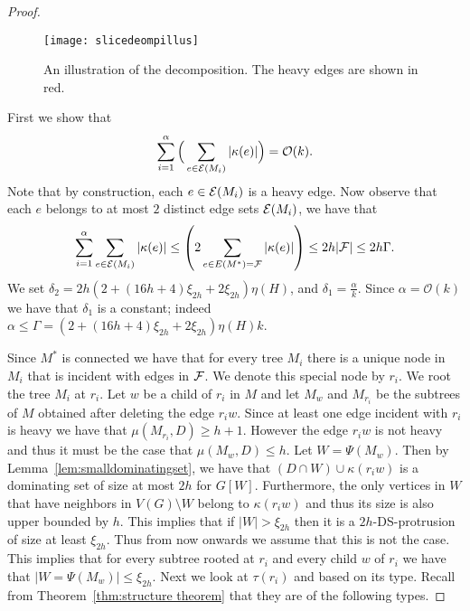 \documentclass[11pt]{article}
\newcommand{\cO}{\mathcal{O}}
\begin{document}
\begin{proof}
\begin{figure}[t]
\begin{center}
\texttt{[image: slicedeompillus]}
\end{center}
 \caption{\label{illus-decompos} An illustration of the decomposition. The heavy edges are shown in red.}
\end{figure}

First we show that $$\sum_{i=1}^{\alpha} \Big(\sum_{e\in {\cal E}(M_i)} |\kappa(e)|\Big)=\cO(k).$$ 
Note that by construction, each  $e\in {\cal E}(M_i)$ is a heavy edge. Now observe that each $e$  belongs to at most $2$ distinct edge sets ${\cal E}(M_i)$, we have that $$\sum_{i=1}^{\alpha} \sum_{e\in {\cal E}(M_i)} |\kappa(e)| \leq \left(2 \sum_{e\in E(M^*)={\cal F}} |\kappa(e)| \right)\leq 2h |{\cal F}|\leq 2h\Gamma.$$ 
We set $\delta_2 = 2h(2+ (16h+4)\xi_{2h}+2 \xi_{2h})\eta(H)$, and $\delta_1=\frac{\alpha}{k}$. Since $\alpha = \cO(k)$ we have that $\delta_1$ is a constant; indeed $\alpha\leq \Gamma= (2+ (16h+4)\xi_{2h}+2 \xi_{2h})\eta(H)k$. 



Since $M^*$ is connected we have that for every tree $M_i$ there is a unique node in $M_i$ that is incident with  edges in $\cal F$. We denote this special node by $r_i$. We root the tree $M_i$ at $r_i$. Let $w$ be a child of $r_i$ in $M$ and let $M_w$  and $M_{r_i}$ be the subtrees of $M$ obtained after deleting the edge $r_iw$. Since at least one edge incident with  $r_i$ is heavy we have that $\mu(M_{r_i},D)\geq h+1$. However the edge $r_iw$ is not heavy and thus it must be the case that $\mu(M_{w},D)\leq h$. Let $W=\Psi(M_w)$. Then  by Lemma~\ref{lem:smalldominatingset}, we have that  $(D\cap W)\cup \kappa(r_iw)$ is a dominating set of size at most $2h$ for $G[W]$. Furthermore, the only vertices in $W$ that have neighbors in $V(G)\setminus W$ belong to $\kappa(r_iw)$ and thus its size is also upper bounded by $h$. This implies that if $|W|>\xi_{2h}$ then it is a  $2h$-{\sc DS}-protrusion of size at least $\xi_{2h}$. Thus  from now onwards we assume that this is not the case. This implies that for every subtree rooted at $r_i$ and every child $w$ of $r_i$  we have that 
 $|W=\Psi(M_w)|\leq \xi_{2h}$. Next we look at $\tau(r_i)$  and based on its type.  Recall from Theorem~\ref{thm:structure theorem} that they are of the following types. 
 
 \medskip
 

\end{proof}
\end{document}
